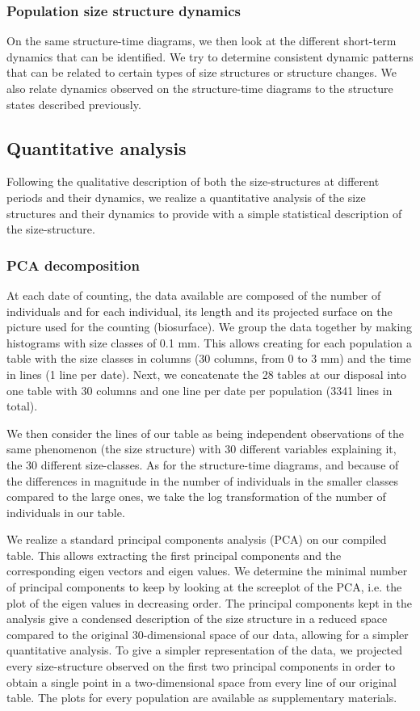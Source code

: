 \subsubsection{Population size structure dynamics}

On the same structure-time diagrams, we then look at the different short-term
dynamics that can be identified. We try to determine consistent dynamic patterns
that can be related to certain types of size structures or structure changes. We
also relate dynamics observed on the structure-time diagrams to the structure
states described previously.

\subsection{Quantitative analysis}

Following the qualitative description of both the size-structures at different
periods and their dynamics, we realize a quantitative analysis of the size
structures and their dynamics to provide with a simple statistical description
of the size-structure.

\subsubsection{PCA decomposition}

At each date of counting, the data available are composed of the number of
individuals and for each individual, its length and its projected surface on the
picture used for the counting (biosurface). We group the data together by making
histograms with size classes of 0.1 mm. This allows creating for each population
a table with the size classes in columns (30 columns, from 0 to 3 mm) and the
time in lines (1 line per date). Next, we concatenate the 28 tables at our
disposal into one table with 30 columns and one line per date per population
(3341 lines in total).

We then consider the lines of our table as being independent observations of the
same phenomenon (the size structure) with 30 different variables explaining it,
the 30 different size-classes. As for the structure-time diagrams, and because
of the differences in magnitude in the number of individuals in the smaller
classes compared to the large ones, we take the log transformation of the number
of individuals in our table.

We realize a standard principal components analysis (PCA) on our compiled table.
This allows extracting the first principal components and the corresponding
eigen vectors and eigen values. We determine the minimal number of principal
components to keep by looking at the screeplot of the PCA, i.e. the plot of the
eigen values in decreasing order. The principal components kept in the analysis
give a condensed description of the size structure in a reduced space compared
to the original 30-dimensional space of our data, allowing for a simpler
quantitative analysis. To give a simpler representation of the data, we
projected every size-structure observed on the first two principal components in
order to obtain a single point in a two-dimensional space from every line of our
original table. The plots for every population are available as supplementary
materials.

